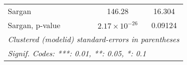 \begin{tabular}{lcccc}
   Sargan                                       &                 &                        & 146.28                 & 16.304\\  
   Sargan, p-value                              &                 &                        & $2.17\times 10^{-26}$  & 0.09124\\  
   \midrule \midrule
   \multicolumn{5}{l}{\emph{Clustered (modelid) standard-errors in parentheses}}\\
   \multicolumn{5}{l}{\emph{Signif. Codes: ***: 0.01, **: 0.05, *: 0.1}}\\
\end{tabular}
\par\endgroup


